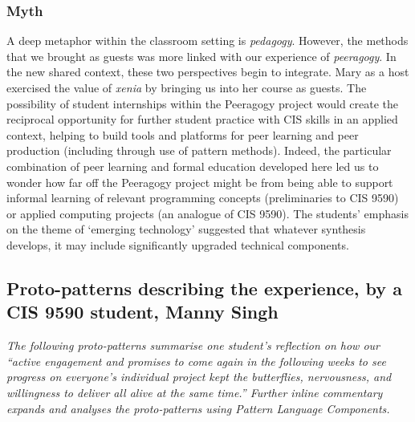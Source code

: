 \documentclass[acmlarge,timestamp]{acmart}
\begin{document}
\subsubsection{Myth}
A deep metaphor within the classroom setting is \emph{pedagogy}.
However, the methods that we brought as guests was more linked with
our experience of \emph{peeragogy}.  In the new shared context, these
two perspectives begin to integrate.  Mary as a host exercised the
value of \emph{xenia} by bringing us into her course as guests.  The
possibility of student internships within the Peeragogy project would
create the reciprocal opportunity for further student practice with
CIS skills in an applied context, helping to build tools and platforms
for peer learning and peer production (including through use of
pattern methods).  Indeed, the particular combination of peer learning
and formal education developed here led us to wonder how far off the
Peeragogy project might be from being able to support informal
learning of relevant programming concepts (preliminaries to CIS 9590)
or applied computing projects (an analogue of CIS 9590).  The
students’ emphasis on the theme of ‘emerging technology’ suggested
that whatever synthesis develops, it may include significantly
upgraded technical components.

\subsection{Proto-patterns describing the experience, by a CIS 9590 student, Manny Singh}\label{sec:manny-protopatterns}


\emph{The following proto-patterns summarise one student’s reflection
on how our “active engagement and promises to come again in the
following weeks to see progress on everyone’s individual project kept
the butterflies, nervousness, and willingness to deliver all alive at
the same time.”  Further inline commentary expands and analyses the proto-patterns using {\sc Pattern Language Components}.}
\end{document}

